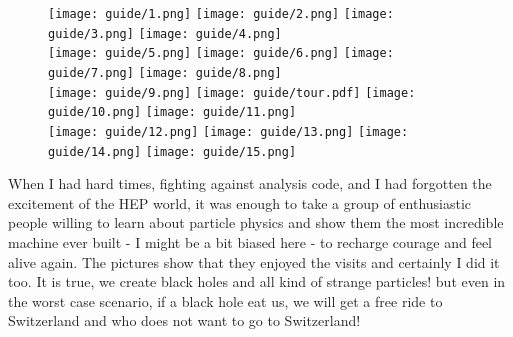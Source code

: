 \begin{figure}[h]
     \texttt{[image: guide/1.png]}  
     \texttt{[image: guide/2.png]}
     \texttt{[image: guide/3.png]}
     \texttt{[image: guide/4.png]}\\
     \texttt{[image: guide/5.png]}
     \texttt{[image: guide/6.png]}
     \texttt{[image: guide/7.png]}
     \texttt{[image: guide/8.png]}\\
     \texttt{[image: guide/9.png]}
     \texttt{[image: guide/tour.pdf]}
     \texttt{[image: guide/10.png]}
     \texttt{[image: guide/11.png]}\\
     \texttt{[image: guide/12.png]}
     \texttt{[image: guide/13.png]}
     \texttt{[image: guide/14.png]}
     \texttt{[image: guide/15.png]}
   \end{figure}

When I had hard times, fighting against analysis code, and I had forgotten the excitement of the HEP world, it was enough to take a group of enthusiastic people willing to learn about particle physics and show them the most incredible machine ever built - I might be a bit biased here - to recharge courage and feel alive again. The pictures show that they enjoyed the visits and certainly I did it too. It is true, we create black holes and all kind of strange particles! but even in the worst case scenario, if a black hole eat us, we will get a free ride to Switzerland and who does not want to go to Switzerland!     


